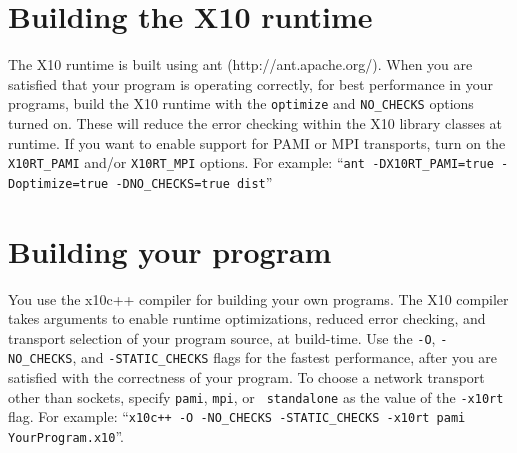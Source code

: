\section{Building the X10 runtime}
The X10 runtime is built using ant (http://ant.apache.org/).  When you
are satisfied that your program is operating correctly, for best performance in
your programs, build the X10 runtime with the {\tt optimize} and
{\tt NO\_CHECKS} options turned on.  These will reduce the error checking
within the X10 library classes at runtime.  If you want to enable support for
PAMI or MPI transports, turn on the {\tt X10RT\_PAMI} and/or {\tt X10RT\_MPI}
options.  For example: ``{\tt ant -DX10RT\_PAMI=true -Doptimize=true
-DNO\_CHECKS=true dist}''

\section{Building your program}
You use the x10c++ compiler for building your own programs.  The X10 compiler
takes arguments to enable runtime optimizations, reduced error checking, and
transport selection of your program source, at build-time.  Use the {\tt -O},
{\tt -NO\_CHECKS}, and {\tt -STATIC\_CHECKS} flags for the fastest performance,
after you are satisfied with the correctness of your program.  To choose a
network transport other than sockets, specify {\tt pami}, {\tt mpi}, or {\tt
standalone} as the value of the {\tt -x10rt} flag.  For example: 
``{\tt x10c++ -O -NO\_CHECKS -STATIC\_CHECKS -x10rt pami YourProgram.x10}''.
